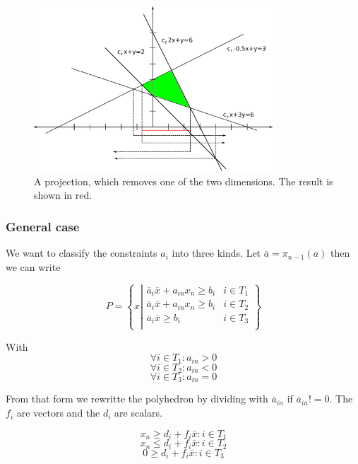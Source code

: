 \begin{figure}[hbt]
\begin{center}
\includegraphics[width=0.8\textwidth]{./images/motzkin.pdf}
\end{center}
\caption{A projection, which removes one of the two dimensions. The result is shown in red.}
\label{Fig:motzkinExample}
\end{figure}

\subsubsection*{General case}
We want to classify the constraints $a_i$ into three kinds. Let $\overline a = \pi_{n-1}(a)$ then we can write  

\[P=\left\{x\left| \begin{array}{cr}
\overline a_i\overline x +a_{in}x_n \geq b_i & i\in T_1\\
\overline a_i\overline x +a_{in}x_n \geq b_i & i\in T_2\\
\overline a_i\overline x \geq b_i & i\in T_3\\
\end{array}\right.\right\}\]

With 
$$\forall i\in T_1: a_{in}>0$$ $$\forall i\in T_2: a_{in}<0$$ $$ \forall i\in T_3: a_{in}=0 $$

From that form we rewritte the polyhedron by dividing with $\overline a_{in}$ if $\overline a_{in}!=0$. The $f_i$ are vectors and the $d_i$ are scalars. 

\begin{equation}\label{For:Motz1}x_n \geq  d_i + f_i \bar x : i \in T_1 \end{equation}
\begin{equation}\label{For:Motz2}x_n \leq  d_i+f_i \bar x : i \in T_2 \end{equation}
\begin{equation}\label{For:Motz3}0 \geq  d_i+f_i \bar x : i \in T_3 \end{equation}

